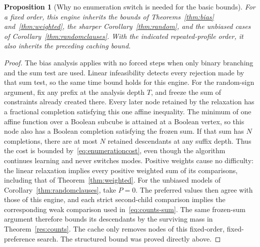\documentclass[11pt,a4paper]{article}
\newtheorem{proposition}[theorem]{Proposition}
\theoremstyle{definition}
\theoremstyle{remark}
\begin{document}
\begin{proposition}[Why no enumeration switch is needed for the basic bounds]
For a fixed order, this engine inherits the bounds of
Theorems~\ref{thm:bias} and~\ref{thm:weighted}, the sharper
Corollary~\ref{thm:random}, and the unbiased cases of
Corollary~\ref{thm:randomclauses}. With the indicated repeated-profile order,
it also inherits the preceding caching bound.
\end{proposition}
\begin{proof}
The bias analysis applies with no forced steps when only binary branching
and the sum test are used. Linear infeasibility detects every rejection
made by that sum test, so the same time bound holds for this engine. For the random-sign argument, fix any
prefix at the analysis depth $T$, and freeze the sum of constraints already
created there. Every later node retained by the relaxation has a fractional
completion satisfying this one affine inequality. The minimum of one affine
function over a Boolean subcube is attained at a Boolean vertex, so this
node also has a Boolean completion satisfying the frozen sum. If that sum
has $N$ completions, there are at most $N$ retained descendants at any suffix
depth. Thus the cost is bounded by~\eqref{eq:enumerationcost}, even though
the algorithm continues learning and never switches modes.
Positive weights cause no difficulty: the linear relaxation implies
every positive weighted sum of its comparisons, including that of
Theorem~\ref{thm:weighted}. For the unbiased models of
Corollary~\ref{thm:randomclauses}, take $P=0$.
The preferred values then agree with those of this engine, and each strict
second-child comparison implies the corresponding weak comparison used
in~\eqref{eq:counts-sum}. The same frozen-sum argument therefore bounds
its descendants by the surviving mass in Theorem~\ref{res:counts}.
The cache only removes nodes of this fixed-order, fixed-preference search. The structured
bound was proved directly above.
\end{proof}
\end{document}
